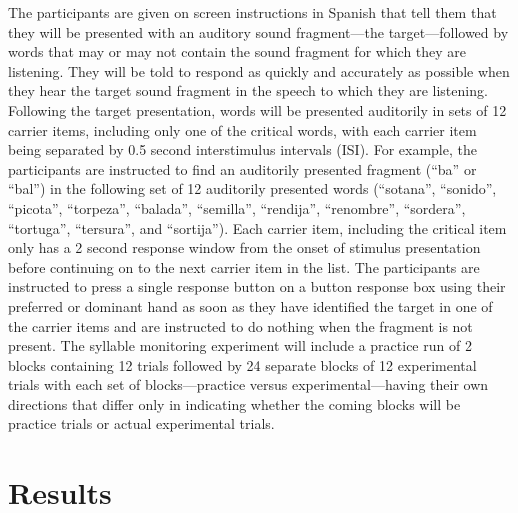 The participants are given on screen instructions in Spanish that tell them that they will be presented with an auditory sound fragment—the target—followed by words that may or may not contain the sound fragment for which they are listening. They will be told to respond as quickly and accurately as possible when they hear the target sound fragment in the speech to which they are listening. Following the target presentation, words will be presented auditorily in sets of 12 carrier items, including only one of the critical words, with each carrier item being separated by 0.5 second interstimulus intervals (ISI). For example, the participants are instructed to find an auditorily presented fragment (“ba” or “bal”) in the following set of 12 auditorily presented words (“sotana”, “sonido”, “picota”, “torpeza”, “balada”, “semilla”, “rendija”, “renombre”, “sordera”, “tortuga”, “tersura”, and “sortija”). Each carrier item, including the critical item only has a 2 second response window from the onset of stimulus presentation before continuing on to the next carrier item in the list. The participants are instructed to press a single response button on a button response box using their preferred or dominant hand as soon as they have identified the target in one of the carrier items and are instructed to do nothing when the fragment is not present. The syllable monitoring experiment will include a practice run of 2 blocks containing 12 trials followed by 24 separate blocks of 12 experimental trials with each set of blocks—practice versus experimental—having their own directions that differ only in indicating whether the coming blocks will be practice trials or actual experimental trials.




\section{Results}

